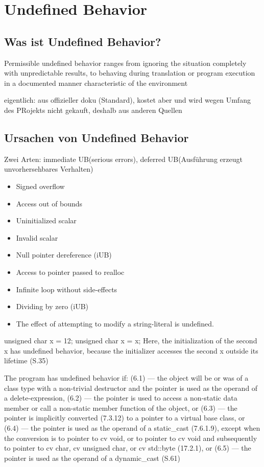 \chapter{Undefined Behavior}
\label{ch:ub}

\section{Was ist Undefined Behavior?}
\label{sec:ub_was}

\glqq{}Permissible undefined behavior ranges from ignoring the situation completely with unpredictable results, to behaving during translation or program execution in a
documented manner characteristic of the environment\grqq{}\cite[S.8]{book:cpp-standard}


eigentlich: aus offizieller doku (Standard), kostet aber und wird wegen Umfang des PRojekts
nicht gekauft, deshalb aus anderen Quellen

\section{Ursachen von Undefined Behavior}
\label{sec:ub_ursachen}

Zwei Arten: immediate UB(serious errors), deferred UB(Ausführung erzeugt unvorhersehbares Verhalten)

\begin{itemize}
    \item Signed overflow
    \item Access out of bounds
    \item Uninitialized scalar
    \item Invalid scalar
    \item Null pointer dereference (iUB)
    \item Access to pointer passed to realloc
    \item Infinite loop without side-effects
    \item Dividing by zero (iUB)
    \item The effect of attempting to modify a string-literal is undefined.
\end{itemize}

unsigned char x = 12;
{ unsigned char x = x; }
Here, the initialization of the second x has undefined behavior, because the initializer accesses the second x outside its
lifetime (S.35)

The program has undefined behavior if:
(6.1) — the object will be or was of a class type with a non-trivial destructor and the pointer is used as the
operand of a delete-expression,
(6.2) — the pointer is used to access a non-static data member or call a non-static member function of the
object, or
(6.3) — the pointer is implicitly converted (7.3.12) to a pointer to a virtual base class, or
(6.4) — the pointer is used as the operand of a static\_cast (7.6.1.9), except when the conversion is to pointer
to cv void, or to pointer to cv void and subsequently to pointer to cv char, cv unsigned char, or
cv std::byte (17.2.1), or
(6.5) — the pointer is used as the operand of a dynamic\_cast
(S.61)

